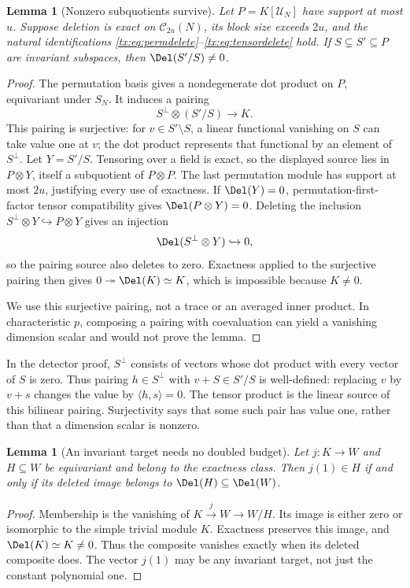 \documentclass[11pt,a4paper,oneside,openany]{book}
\newtheorem{lemma}[theorem]{Lemma}
\theoremstyle{definition}\newtheorem{definition}[theorem]{Definition}
\theoremstyle{remark}\newtheorem{remark}[theorem]{Remark}
\numberwithin{equation}{chapter}
\begin{document}
\begin{lemma}[Nonzero subquotients survive]\label{tx:lem:detect}
Let $P=K[\mathcal U_N]$ have support at most $u$. Suppose deletion is
exact on $\mathcal C_{2u}(N)$, its block size exceeds $2u$, and the
natural identifications \eqref{tx:eq:permdelete}--\eqref{tx:eq:tensordelete}
hold. If $S\subsetneq S'\subseteq P$ are invariant subspaces, then
$\Del(S'/S)\ne0$.
\end{lemma}
\begin{proof}
The permutation basis gives a nondegenerate dot product on $P$,
equivariant under $S_N$. It induces a pairing
\[
                         S^\perp\otimes(S'/S)\longrightarrow K.
\]
This pairing is surjective: for $v\in S'\setminus S$, a linear
functional vanishing on $S$ can take value one at $v$; the dot product
represents that functional by an element of $S^\perp$.
Let $Y=S'/S$. Tensoring over a field is exact, so the displayed
source lies in $P\otimes Y$, itself a subquotient of $P\otimes P$.
The last permutation module has support at most $2u$, justifying
every use of exactness. If $\Del(Y)=0$, permutation-first-factor tensor
compatibility gives $\Del(P\otimes Y)=0$. Deleting the inclusion
$S^\perp\otimes Y\hookrightarrow P\otimes Y$ gives an injection
\[
                  \Del(S^\perp\otimes Y)\hookrightarrow0,
\]
so the pairing source also deletes to zero. Exactness applied to the
surjective pairing then gives $0\twoheadrightarrow\Del(K)\simeq K$,
which is impossible because $K\ne0$.

We use this surjective pairing, not a trace or an averaged inner
product. In characteristic $p$, composing a pairing with coevaluation
can yield a vanishing dimension scalar and would not prove the lemma.
\end{proof}

In the detector proof, $S^\perp$ consists of vectors whose dot product
with every vector of $S$ is zero. Thus pairing $h\in S^\perp$ with
$v+S\in S'/S$ is well-defined: replacing $v$ by $v+s$ changes the
value by $\langle h,s\rangle=0$. The tensor product is the linear
source of this bilinear pairing. Surjectivity says that some such
pair has value one, rather than that a dimension scalar is nonzero.

\begin{lemma}[An invariant target needs no doubled budget]\label{tx:lem:constant}
Let $j:K\to W$ and $H\subseteq W$ be equivariant and belong to the
exactness class. Then $j(1)\in H$ if and only if its deleted image
belongs to $\Del(H)\subseteq\Del(W)$.
\end{lemma}
\begin{proof}
Membership is the vanishing of $K\xrightarrow{j}W\to W/H$.
Its image is either zero or isomorphic to the simple trivial module
$K$. Exactness preserves this image, and $\Del(K)\simeq K\ne0$.
Thus the composite vanishes exactly when its deleted composite does.
The vector $j(1)$ may be any invariant target, not just the constant
polynomial one.
\end{proof}
\end{document}

